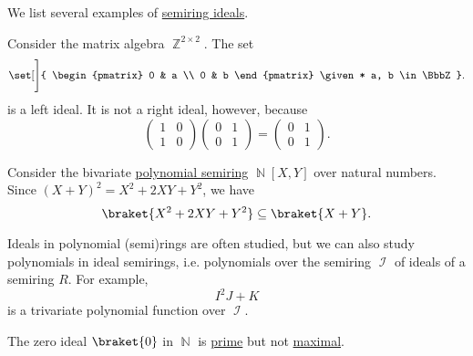 \begin{example}\label{ex:def:semiring_ideal}
  We list several examples of \hyperref[def:semiring_ideal]{semiring ideals}.
  \begin{thmenum}
     Consider the matrix algebra \( \BbbZ^{2 \times 2} \). The set
    \begin{equation*}
      \set[\Bigg]
      {
        \begin{pmatrix}
          0 & a \\
          0 & b
        \end{pmatrix}
        \given*
        a, b \in \BbbZ
      }.
    \end{equation*}
    is a left ideal. It is not a right ideal, however, because
    \begin{equation*}
      \begin{pmatrix}
        1 & 0 \\
        1 & 0
      \end{pmatrix}
      \begin{pmatrix}
        0 & 1 \\
        0 & 1
      \end{pmatrix}
      =
      \begin{pmatrix}
        0 & 1 \\
        0 & 1
      \end{pmatrix}.
    \end{equation*}

     Consider the bivariate \hyperref[def:polynomial_semiring]{polynomial semiring} \( \BbbN[X, Y] \) over natural numbers. Since \( (X + Y)^2 = X^2 + 2XY + Y^2 \), we have
    \begin{equation*}
      \braket{ X^2 + 2XY + Y^2 } \subseteq \braket{ X + Y }.
    \end{equation*}

     Ideals in polynomial (semi)rings are often studied, but we can also study polynomials in ideal semirings, i.e. polynomials over the semiring \( \mscrI \) of ideals of a semiring \( R \). For example,
    \begin{equation*}
      I^2 J + K
    \end{equation*}
    is a trivariate polynomial function over \( \mscrI \).

     The zero ideal \( \braket{ 0 } \) in \( \BbbN \) is \hyperref[def:semiring_ideal/prime]{prime} but not \hyperref[def:semiring_ideal/maximal]{maximal}.


\end{thmenum}
\end{example}

